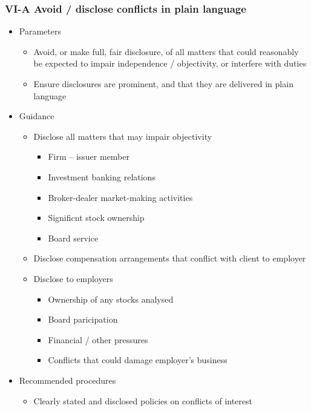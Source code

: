 \documentclass[../notes_compiled.tex]{subfiles}
\begin{document}
\subsubsection{VI-A Avoid / disclose conflicts in plain language}
\begin{itemize}
\item Parameters
\begin{itemize}
\item Avoid, or make full, fair disclosure, of all matters that could reasonably be expected to impair independence / objectivity, or interfere with duties
\item Ensure disclosures are prominent, and that they are delivered in plain language
\end{itemize}
\item Guidance
\begin{itemize}
\item Disclose all matters that may impair objectivity
\begin{itemize}
\item Firm -- issuer member
\item Investment banking relations
\item Broker-dealer market-making activities
\item Significnt stock ownership
\item Board service
\end{itemize}
\item Disclose compensation arrangements that conflict with client to employer
\item Disclose to employers
\begin{itemize}
\item Ownership of any stocks analysed
\item Board paricipation
\item Financial / other pressures
\item Conflicts that could damage employer’s business
\end{itemize}
\end{itemize}
\item Recommended procedures
\begin{itemize}
\item Clearly stated and disclosed policies on conflicts of interest
\end{itemize}
\end{itemize}
\end{document}
